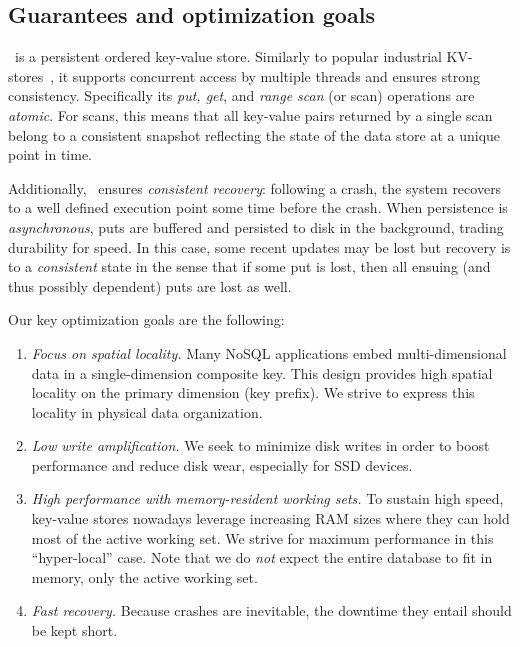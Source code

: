 \subsection{Guarantees and optimization goals}
\sys\ is a persistent ordered key-value store. Similarly to popular industrial KV-stores~\cite{hbase,leveldb,RocksDB}, 
 it supports concurrent access by multiple threads and ensures 
strong consistency. 
Specifically its \emph{put, get}, and \emph{range scan} (or scan) operations are \emph{atomic}.  
For scans, this means that all key-value pairs returned by a single scan belong to a consistent 
snapshot reflecting the state of the data store at a unique point in time.

Additionally, \sys\ ensures \emph{consistent recovery}: following a crash, the system recovers to a well defined execution 
point some time before the crash. 
When persistence is \emph{asynchronous}, puts are buffered and persisted to disk in the background,  
 trading durability for speed. In this case, some recent updates may be lost but 
 recovery is to a \emph{consistent} state  
in the sense that if some put is lost, then all ensuing (and thus possibly dependent) puts are lost as well.

Our key optimization goals are the following:
\begin{enumerate}
\item \emph{Focus on spatial locality.}
 Many NoSQL applications embed multi-dimensional data in a single-dimension composite key. 
 This design provides high spatial locality on the primary dimension (key prefix). We strive
 to express this locality in physical data organization.


\item \emph{Low write amplification.} We seek to minimize disk writes in order to boost performance 
and reduce disk wear, especially for SSD devices.
 
\item \emph{High performance  with memory-resident working sets.}
To sustain high speed, key-value stores nowadays leverage increasing RAM sizes 
where they can hold most of the active working set. We strive for maximum performance 
in this ``hyper-local'' case. Note that we do \emph{not} expect the entire database to fit in
memory, only the active working set.  
 
\item \emph{Fast recovery.}  Because crashes are inevitable, 
the downtime they entail should be kept  short. 
\end{enumerate}

